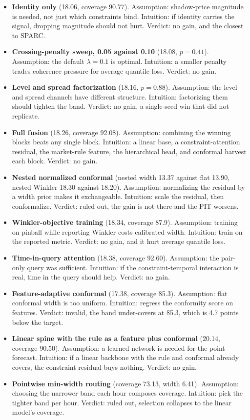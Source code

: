 \documentclass[twoside]{article}
\begin{document}
\begin{itemize}\setlength\itemsep{2pt}
\item \textbf{Identity only} (18.06, coverage 90.77). Assumption: shadow-price magnitude is needed, not just which constraints bind. Intuition: if identity carries the signal, dropping magnitude should not hurt. Verdict: no gain, and the closest to SPARC.
\item \textbf{Crossing-penalty sweep, 0.05 against 0.10} (18.08, $p=0.41$). Assumption: the default $\lambda=0.1$ is optimal. Intuition: a smaller penalty trades coherence pressure for average quantile loss. Verdict: no gain.
\item \textbf{Level and spread factorization} (18.16, $p=0.88$). Assumption: the level and spread channels have different structure. Intuition: factorizing them should tighten the band. Verdict: no gain, a single-seed win that did not replicate.
\item \textbf{Full fusion} (18.26, coverage 92.08). Assumption: combining the winning blocks beats any single block. Intuition: a linear base, a constraint-attention residual, the market-rule feature, the hierarchical head, and conformal harvest each block. Verdict: no gain.
\item \textbf{Nested normalized conformal} (nested width 13.37 against flat 13.90, nested Winkler 18.30 against 18.20). Assumption: normalizing the residual by a width prior makes it exchangeable. Intuition: scale the residual, then conformalize. Verdict: ruled out, the gain is not there and the PIT worsens.
\item \textbf{Winkler-objective training} (18.34, coverage 87.9). Assumption: training on pinball while reporting Winkler costs calibrated width. Intuition: train on the reported metric. Verdict: no gain, and it hurt average quantile loss.
\item \textbf{Time-in-query attention} (18.38, coverage 92.60). Assumption: the pair-only query was sufficient. Intuition: if the constraint-temporal interaction is real, time in the query should help. Verdict: no gain.
\item \textbf{Feature-adaptive conformal} (17.38, coverage 85.3). Assumption: flat conformal width is too uniform. Intuition: regress the conformity score on features. Verdict: invalid, the band under-covers at 85.3, which is 4.7 points below the target.
\item \textbf{Linear spine with the rule as a feature plus conformal} (20.14, coverage 90.50). Assumption: a learned network is needed for the point forecast. Intuition: if a linear backbone with the rule and conformal already covers, the constraint residual buys nothing. Verdict: no gain.
\item \textbf{Pointwise min-width routing} (coverage 73.13, width 6.41). Assumption: choosing the narrower band each hour composes coverage. Intuition: pick the tighter band per hour. Verdict: ruled out, selection collapses to the linear model's coverage.
\end{itemize}
\end{document}
